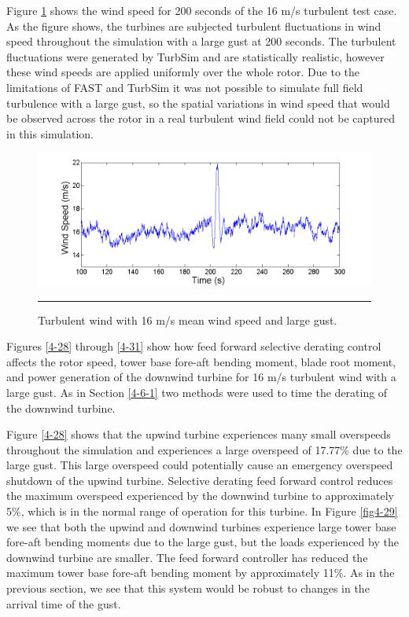 Figure \ref{fig4-27} shows the wind speed for 200 seconds of the 16 m/s turbulent test case. As the figure shows, the turbines are subjected turbulent fluctuations in wind speed throughout the simulation with a large gust at 200 seconds. The turbulent fluctuations were generated by TurbSim and are statistically realistic, however these wind speeds are applied uniformly over the whole rotor. Due to the limitations of FAST and TurbSim it was not possible to simulate full field turbulence with a large gust, so the spatial variations in wind speed that would be observed across the rotor in a real turbulent wind field could not be captured in this simulation.

\begin{figure}[htbp]
	\centering
		\includegraphics[trim = {1cm 0 2cm 0}, clip, width = \linewidth]{Figures/ch4Figures/fig4-27.png}
		\rule{35em}{0.5pt}
	\caption{Turbulent wind with 16 m/s mean wind speed and large gust.}
	\label{fig4-27}
\end{figure}

Figures \ref{4-28} through \ref{4-31} show how feed forward selective derating control affects the rotor speed, tower base fore-aft bending moment, blade root moment, and power generation of the downwind turbine for 16 m/s turbulent wind with a large gust. As in Section \ref{4-6-1} two methods were used to time the derating of the downwind turbine.

Figure \ref{4-28} shows that the upwind turbine experiences many small overspeeds throughout the simulation and experiences a large overspeed of 17.77\% due to the large gust. This large overspeed could potentially cause an emergency overspeed shutdown of the upwind turbine. Selective derating feed forward control reduces the maximum overspeed experienced by the downwind turbine to approximately 5\%, which is in the normal range of operation for this turbine. In Figure \ref{fig4-29} we see that both the upwind and downwind turbines experience large tower base fore-aft bending moments due to the large gust, but the loads experienced by the downwind turbine are smaller. The feed forward controller has reduced the maximum tower base fore-aft bending moment by approximately 11\%. As in the previous section, we see that this system would be robust to changes in the arrival time of the gust. 

